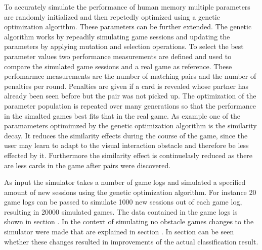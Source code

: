 To accurately simulate the performance of human memory multiple parameters are randomly initialized and then repetedly optimized using a genetic optimization algorithm. These parameters can be further extended. The genetic algorithm works by repeadily simulating game sessions and updating the parameters by applying mutation and selection operations. To select the best parameter values two performance measurements are defined and used to compare the simulated game sessions and a real game as reference. These perfomarmce measurements are the number of matching pairs and the number of penalties per round. Penalties are given if a card is revealed whose partner has already been seen before but the pair was not picked up. The optimization of the parameter population is repeated over many generations so that the performance in the simalted games best fits that in the real game. As example one of the paramameters optimimzed by the genetic optimization algorithm is the similarity decay. It reduces the similarity effects during the course of the game, since the user may learn to adapt to the visual interaction obstacle and therefore be less effected by it. Furthermore the similarity effect is continuelasly reduced as there are less cards in the game after pairs were discovered. 

As input the simulator takes a number of game logs and simulated a specified amount of new sessions using the genetic optimization algorithm. For instance 20 game logs can be passed to simulate 1000 new sessions out of each game log, resulting in 20000 simulated games. The data contained in the game logs is shown in section . In the context of simulating no obstacle games changes to the simulator were made that are explained in section . In section  can be seen whether these changes resulted in improvements of the actual classification result. 

